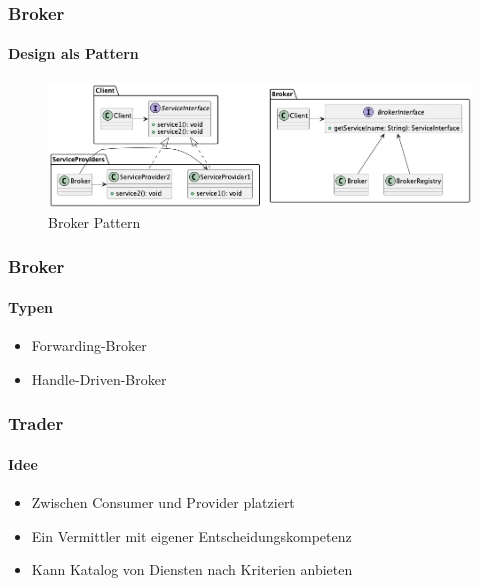 \begin{frame}
  \frametitle{Broker}
  \framesubtitle{Design als Pattern}
\begin{figure}[ht]
  \centering
  \includegraphics[width=1\textwidth]{fig/uml/broker.png}
  \caption{Broker Pattern}
  \label{fig:broker}
\end{figure}
\end{frame}

\begin{frame}
  \frametitle{Broker}
  \framesubtitle{Typen}
  \begin{itemize}
    \item Forwarding-Broker
    \item Handle-Driven-Broker 
  \end{itemize}
\end{frame}

\begin{frame}
  \frametitle{Trader}
  \framesubtitle{Idee}
  \begin{itemize}
    \item Zwischen Consumer und Provider platziert
    \item Ein Vermittler mit eigener Entscheidungskompetenz
    \item Kann Katalog von Diensten nach Kriterien anbieten
  \end{itemize}
\end{frame}
